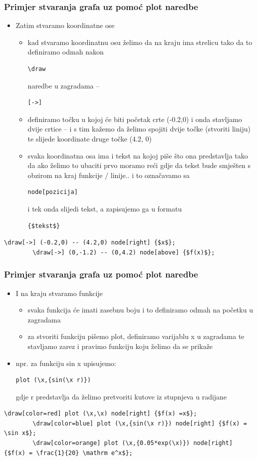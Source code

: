 \documentclass{beamer}
\begin{document}
\begin{frame}[fragile]
	\frametitle{Primjer stvaranja grafa uz pomoć plot naredbe}
		\begin{itemize}
			\item Zatim stvaramo koordinatne ose
			\begin{itemize}
			\item kad stvaramo koordinatnu osu želimo da na kraju ima strelicu tako da to definiramo odmah nakon \begin{verbatim}\draw\end{verbatim} naredbe u zagradama – \begin{verbatim}[->]\end{verbatim}
			\item definiramo točku u kojoj će biti početak crte (-0.2,0) i onda stavljamo dvije crtice -- i s tim kažemo da želimo spojiti dvije točke (stvoriti liniju) te slijede koordinate druge točke (4.2, 0)
			\item svaka koordinatna osa ima i tekst na kojoj piše što ona predstavlja tako da ako želimo to ubaciti prvo moramo reći gdje da tekst bude smješten s obzirom na kraj funkcije / linije.. i to označavamo sa \begin{verbatim}node[pozicija]\end{verbatim} i tek onda slijedi tekst, a zapisujemo ga u formatu \begin{verbatim}{$tekst$}\end{verbatim}
			\end{itemize}
		\end{itemize}
		\begin{verbatim}\draw[->] (-0.2,0) -- (4.2,0) node[right] {$x$};
		\draw[->] (0,-1.2) -- (0,4.2) node[above] {$f(x)$};
		\end{verbatim}		
\end{frame}

\begin{frame}[fragile]
	\frametitle{Primjer stvaranja grafa uz pomoć plot naredbe}
		\begin{itemize}
			\item I na kraju stvaramo funkcije
			\begin{itemize}
			\item svaka funkcija će imati zasebnu boju i to definiramo odmah na početku u zagradama
			\item za stvoriti funkciju pišemo plot, definiramo varijablu x u zagradama te stavljamo zarez i pravimo funkciju koju želimo da se prikaže
			\end{itemize}
			\item npr. za funkciju sin x upisujemo: \begin{verbatim}plot (\x,{sin(\x r)})\end{verbatim} gdje r predstavlja da želimo pretvoriti kutove iz stupnjeva u radijane
		\end{itemize} 
		\begin{verbatim}\draw[color=red] plot (\x,\x) node[right] {$f(x) =x$};
		\draw[color=blue] plot (\x,{sin(\x r)}) node[right] {$f(x) = \sin x$};
		\draw[color=orange] plot (\x,{0.05*exp(\x)}) node[right] {$f(x) = \frac{1}{20} \mathrm e^x$};
		\end{verbatim}	
\end{frame}
\end{document}
